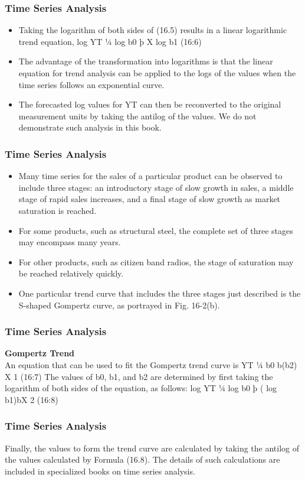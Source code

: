 \documentclass{beamer}
\begin{document}
\begin{frame}
\frametitle{Time Series Analysis}
\begin{itemize}
\item Taking the logarithm of both sides of (16.5) results in a linear logarithmic trend equation,
log YT ¼ log b0 þ X log b1 (16:6)
\item The advantage of the transformation into logarithms is that the linear equation for trend analysis can be
applied to the logs of the values when the time series follows an exponential curve.
\item  The forecasted log values
for YT can then be reconverted to the original measurement units by taking the antilog of the values. We do not
demonstrate such analysis in this book.
\end{itemize}
\end{frame}
\begin{frame}
\frametitle{Time Series Analysis}
\begin{itemize}
\item Many time series for the sales of a particular product can be observed to include three stages: an
introductory stage of slow growth in sales, a middle stage of rapid sales increases, and a final stage of slow
growth as market saturation is reached.
\item For some products, such as structural steel, the complete set of three
stages may encompass many years. 
\item For other products, such as citizen band radios, the stage of saturation may
be reached relatively quickly. 
\item One particular trend curve that includes the three stages just described is the
S-shaped Gompertz curve, as portrayed in Fig. 16-2(b). 
\end{itemize}
\end{frame}
\begin{frame}
\frametitle{Time Series Analysis}
\textbf{Gompertz Trend}\\
An equation that can be used to fit the Gompertz trend
curve is
YT ¼ b0 b(b2) X
1 (16:7)
The values of b0, b1, and b2 are determined by first taking the logarithm of both sides of the equation, as
follows:
log YT ¼ log b0 þ ( log b1)bX
2 (16:8)

\end{frame}
\begin{frame}
\frametitle{Time Series Analysis}
Finally, the values to form the trend curve are calculated by taking the antilog of the values calculated
by Formula (16.8). The details of such calculations are included in specialized books on time series
analysis.

\end{frame}
\end{document}
